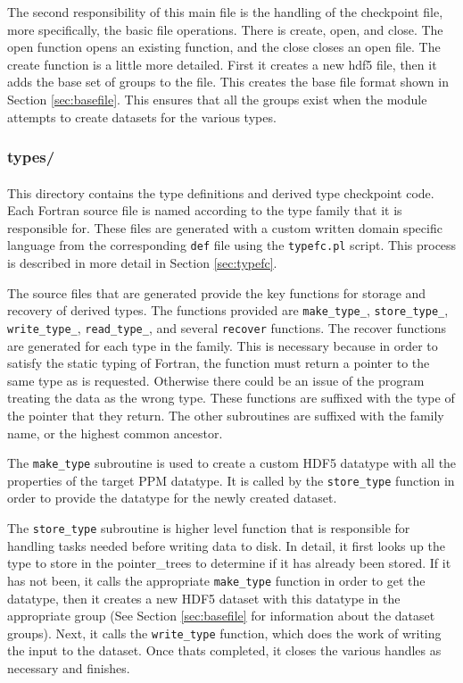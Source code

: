 \documentclass{article}
\begin{document}
The second responsibility of this main file is the handling of the checkpoint file, more specifically, the basic file operations. There is create, open, and close. The open function opens an existing function, and the close closes an open file. The create function is a little more detailed. First it creates a new hdf5 file, then it adds the base set of groups to the file. This creates the base file format shown in Section \ref{sec:basefile}. This ensures that all the groups exist when the module attempts to create datasets for the various types.

\subsubsection{types/}
\label{sec:dirtypes}
\paragraph{}
This directory contains the type definitions and derived type checkpoint code. Each Fortran source file is named according to the type family that it is responsible for. These files are generated with a custom written domain specific language from the corresponding \texttt{def} file using the \texttt{typefc.pl} script. This process is described in more detail in Section \ref{sec:typefc}.

The source files that are generated provide the key functions for storage and recovery of derived types. The functions provided are \texttt{make\_type\_}, \texttt{store\_type\_}, \texttt{write\_type\_}, \texttt{read\_type\_}, and several \texttt{recover} functions. The recover functions are generated for each type in the family. This is necessary because in order to satisfy the static typing of Fortran, the function must return a pointer to the same type as is requested. Otherwise there could be an issue of the program treating the data as the wrong type. These functions are suffixed with the type of the pointer that they return. The other subroutines are suffixed with the family name, or the highest common ancestor.

The \texttt{make\_type} subroutine is used to create a custom HDF5 datatype with all the properties of the target PPM datatype. It is called by the \texttt{store\_type} function in order to provide the datatype for the newly created dataset.

The \texttt{store\_type} subroutine is higher level function that is responsible for handling tasks needed before writing data to disk. In detail, it first looks up the type to store in the pointer\_trees to determine if it has already been stored. If it has not been, it calls the appropriate \texttt{make\_type} function in order to get the datatype, then it creates a new HDF5 dataset with this datatype in the appropriate group (See Section \ref{sec:basefile} for information about the dataset groups). Next, it calls the \texttt{write\_type} function, which does the work of writing the input to the dataset. Once thats completed, it closes the various handles as necessary and finishes.
\end{document}
